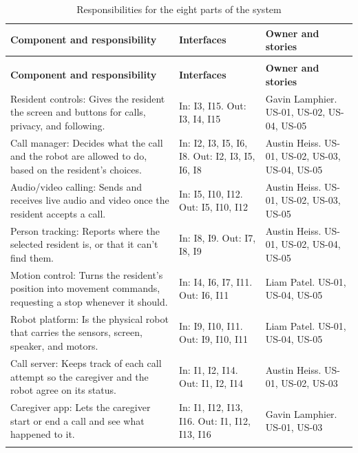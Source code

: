 \documentclass[12pt,letterpaper]{article}
\begin{document}
\begingroup
\small
\setlength{\tabcolsep}{5pt}
\renewcommand{\arraystretch}{1.12}
\begin{longtable}{@{}>{\RaggedRight\arraybackslash}p{}>{\RaggedRight\arraybackslash}p{}>{\RaggedRight\arraybackslash}p{}@{}}
\caption{Responsibilities for the eight parts of the system}\label{tab:components}\\
\toprule
\textbf{Component and responsibility} & \textbf{Interfaces} & \textbf{Owner and stories} \\
\midrule
\endfirsthead
\caption[]{Responsibilities for the eight parts of the system}\\
\toprule
\textbf{Component and responsibility} & \textbf{Interfaces} & \textbf{Owner and stories} \\
\midrule
\endhead
\midrule
\endfoot
\bottomrule
\endlastfoot
Resident controls: Gives the resident the screen and buttons for calls, privacy, and following. & In: I3, I15. Out: I3, I4, I15 & Gavin Lamphier. US-01, US-02, US-04, US-05 \\ \addlinespace[3pt]
Call manager: Decides what the call and the robot are allowed to do, based on the resident's choices. & In: I2, I3, I5, I6, I8. Out: I2, I3, I5, I6, I8 & Austin Heiss. US-01, US-02, US-03, US-04, US-05 \\ \addlinespace[3pt]
Audio/video calling: Sends and receives live audio and video once the resident accepts a call. & In: I5, I10, I12. Out: I5, I10, I12 & Austin Heiss. US-01, US-02, US-03, US-05 \\ \addlinespace[3pt]
Person tracking: Reports where the selected resident is, or that it can't find them. & In: I8, I9. Out: I7, I8, I9 & Austin Heiss. US-01, US-02, US-04, US-05 \\ \addlinespace[3pt]
Motion control: Turns the resident's position into movement commands, requesting a stop whenever it should. & In: I4, I6, I7, I11. Out: I6, I11 & Liam Patel. US-01, US-04, US-05 \\ \addlinespace[3pt]
Robot platform: Is the physical robot that carries the sensors, screen, speaker, and motors. & In: I9, I10, I11. Out: I9, I10, I11 & Liam Patel. US-01, US-04, US-05 \\ \addlinespace[3pt]
Call server: Keeps track of each call attempt so the caregiver and the robot agree on its status. & In: I1, I2, I14. Out: I1, I2, I14 & Austin Heiss. US-01, US-02, US-03 \\ \addlinespace[3pt]
Caregiver app: Lets the caregiver start or end a call and see what happened to it. & In: I1, I12, I13, I16. Out: I1, I12, I13, I16 & Gavin Lamphier. US-01, US-03 \\*
\end{longtable}
\endgroup
\end{document}
